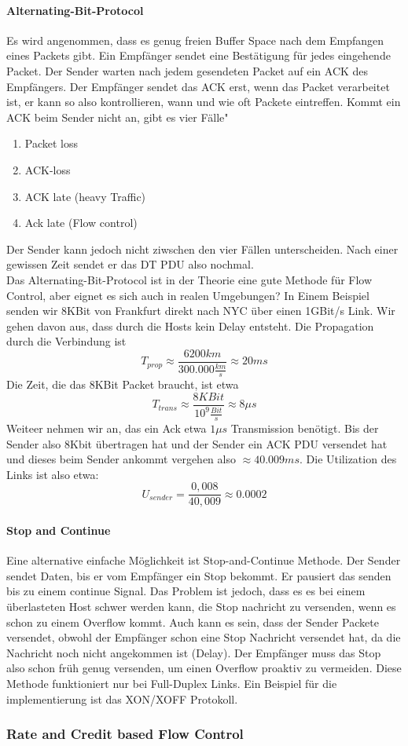 		\paragraph{Alternating-Bit-Protocol}
			Es wird angenommen, dass es genug freien Buffer Space nach dem Empfangen eines Packets gibt. Ein Empfänger sendet eine Bestätigung für jedes eingehende Packet. Der Sender warten nach jedem gesendeten Packet auf ein ACK des Empfängers. Der Empfänger sendet das ACK erst, wenn das Packet verarbeitet ist, er kann so also kontrollieren, wann und wie oft Packete eintreffen. Kommt ein ACK beim Sender nicht an, gibt es vier Fälle"
			\begin{enumerate}
				\item Packet loss
				\item ACK-loss
				\item ACK late (heavy Traffic)
				\item Ack late (Flow control)
			\end{enumerate}
			Der Sender kann jedoch nicht ziwschen den vier Fällen unterscheiden. Nach einer gewissen Zeit sendet er das DT PDU also nochmal. \\
			Das Alternating-Bit-Protocol ist in der Theorie eine gute Methode für Flow Control, aber eignet es sich auch in realen Umgebungen? In Einem Beispiel senden wir 8KBit von Frankfurt direkt nach NYC über einen 1GBit/s Link. Wir gehen davon aus, dass durch die Hosts kein Delay entsteht. Die Propagation durch die Verbindung ist
			$$
				T_{prop} \approx \frac{6200km}{300.000\frac{km}{s}} \approx 20ms
			$$ 
			Die Zeit, die das 8KBit Packet braucht, ist etwa
			$$
				T_{trans} \approx \frac{8KBit}{10^9\frac{Bit}{s}} \approx 8\mu s
			$$ 
			Weiteer nehmen wir an, das ein Ack etwa $1\mu s$ Transmission benötigt. Bis der Sender also 8Kbit übertragen hat und der Sender ein ACK PDU versendet hat und dieses beim Sender ankommt vergehen also $\approx 40.009ms$. Die Utilization des Links ist also etwa:
			$$
				U_{sender} = \frac{0,008}{40,009} \approx 0.0002
			$$
		
		\paragraph{Stop and Continue}
			Eine alternative einfache Möglichkeit ist Stop-and-Continue Methode. Der Sender sendet Daten, bis er vom Empfänger ein Stop bekommt. Er pausiert das senden bis zu einem continue Signal. Das Problem ist jedoch, dass es es bei einem überlasteten Host schwer werden kann, die Stop nachricht zu versenden, wenn es schon zu einem Overflow kommt. Auch kann es sein, dass der Sender Packete versendet, obwohl der Empfänger schon eine Stop Nachricht versendet hat, da die Nachricht noch nicht angekommen ist (Delay). Der Empfänger muss das Stop also schon früh genug versenden, um einen Overflow proaktiv zu vermeiden. Diese Methode funktioniert nur bei Full-Duplex Links. Ein Beispiel für die implementierung ist das XON/XOFF Protokoll.

		\subsubsection{Rate and Credit based Flow Control}
